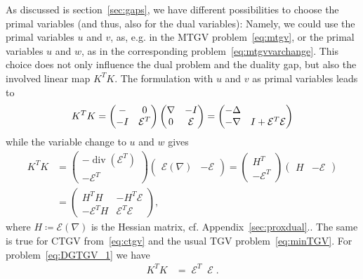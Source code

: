 \documentclass[twocolumn,envcountsame]{svjour3}
\let\div\relax
\DeclareMathOperator{\div}{div}
\DeclareMathOperator{\symgrad}{\mathcal{E}}
\begin{document}
As discussed is section~\ref{sec:gaps}, we have different possibilities to choose the primal variables (and thus, also for the dual variables):
Namely, we could use the primal variables $u$ and $v$, as, e.g. in the MTGV problem~\eqref{eq:mtgv}, or the primal variables $u$ and $w$, as in the corresponding problem~\eqref{eq:mtgvvarchange}.
This choice does not only influence the dual problem and the duality gap, but also the involved linear map $K^{T}K$.
The formulation with $u$ and $v$ as primal variables leads to
\begin{align}\label{eq:KTK-uv}
  K^TK=\begin{pmatrix}-\div&0\\-I&\mathcal{E}^T\end{pmatrix}
    \begin{pmatrix}\nabla&-I\\0&\mathcal{E}\end{pmatrix}
      =\begin{pmatrix}-\Delta&\div\\-\nabla&I+\mathcal{E}^T\mathcal{E}\end{pmatrix}
\end{align}
while the variable change to $u$ and $w$ gives
\begin{align}
  K^TK&=	\begin{pmatrix}-\operatorname{div}(\mathcal{E}^T)\\-\mathcal{E}^T\end{pmatrix}
    	\begin{pmatrix}\mathcal{E}(\nabla)&-\mathcal{E}\end{pmatrix}
	=\begin{pmatrix}H^T\\-\mathcal{E}^T\end{pmatrix}
    	\begin{pmatrix}H&-\mathcal{E}\end{pmatrix}\nonumber\\
	  &=\begin{pmatrix}H^TH&-H^T\mathcal{E}\\-\mathcal{E}^TH&\mathcal{E}^T\mathcal{E}\end{pmatrix},\label{eq:KTK-uw}
\end{align}
 where $H\coloneqq\mathcal{E}(\nabla)$ is the Hessian matrix, cf. Appendix~\ref{sec:proxdual}..
The same is true for CTGV from~\eqref{eq:ctgv}  and the usual TGV problem~\eqref{eq:minTGV}.
For problem~\eqref{eq:DGTGV_1} we have
\begin{align}
  K^TK&=\symgrad^T\symgrad.\label{eq:KTK-v}
\end{align}
\end{document}
